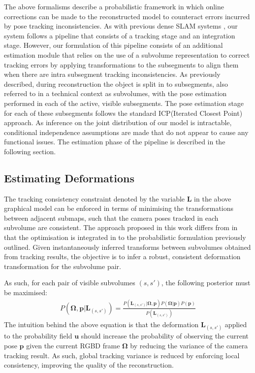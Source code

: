 The above formalisms describe a probabilistic framework in which online corrections can be made to the reconstructed model to counteract 
errors incurred by pose tracking inconsistencies. As with previous dense SLAM systems \cite{Newcombe2011, Prisacariu2014, Neissner2013}, 
our system follows a pipeline that consists of a tracking stage and an integration stage. However, our formulation of this pipeline 
consists of an additional estimation module that relies on the use of a subvolume representation to correct tracking errors by applying 
transformations to the subsegments to align them when there are intra subsegment tracking inconsistencies. 
As previously described, during reconstruction the object is split in to subsegments, also referred to in a technical context as subvolumes, 
with the pose estimation performed in each of the active, visible subsegments. The pose estimation stage for each of these subsegments follows 
the standard ICP(Iterated Closest Point) approach.
As inference on the joint distribution of our model is intractable, conditional independence assumptions are made that do not appear 
to cause any functional issues. The estimation phase of the pipeline is described in the following section.

\subsection{Estimating Deformations}
The tracking consistency constraint denoted by the variable $\mathbf{L}$ in the above graphical model can be enforced in terms of minimising the 
transformations between adjacent submaps, such that the camera poses tracked in each subvolume are consistent.  The approach proposed in this work differs from \cite{Kahler2016} in that the optimisation is integrated in to the probabilistic 
formulation previously outlined. Given instantaneously inferred transforms between subvolumes obtained from tracking results, 
the objective is to infer a robust, consistent deformation transformation for the subvolume pair.

As such, for each pair of visible subvolumes $(s, s')$, the following posterior must be maximised:
\begin{equation}
\begin{split}
P(\mathbf{\Omega}, \mathbf{p} | \mathbf{L}_{(s, s')}) = \frac{P(\mathbf{L}_{(s, s')} | \mathbf{\Omega}, \mathbf{p}) P(\mathbf{\Omega} | \mathbf{p})P(\mathbf{p})}
{P(\mathbf{L}_{(s, s')})}
\end{split}
\end{equation}
The intuition behind the above equation is that the deformation $\mathbf{L}_{(s, s')}$ applied to the probability field $\mathbf{u}$ should 
increase the probability of observing the current pose $\mathbf{p}$ given the current RGBD frame $\mathbf{\Omega}$ by reducing the 
variance of the camera tracking result. As such, global tracking variance is reduced by enforcing local consistency, improving the quality 
of the reconstruction.


